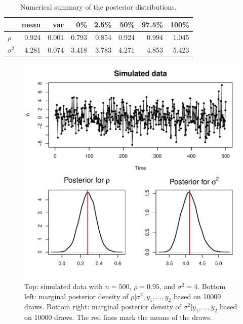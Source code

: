 \documentclass[12pt]{article}
\begin{document}
\begin{table}[H]
\begin{center}
\begin{tabular}{l|rrrrrrr}
           &  mean & var   & 0\%   & 2.5\% & 50\%  & 97.5\% & 100\% \\ \hline\hline
$\rho$     & 0.924 & 0.001 & 0.793 & 0.854 & 0.924 & 0.994  & 1.045 \\ 
$\sigma^2$ & 4.281 & 0.074 & 3.418 & 3.783 & 4.271 & 4.853  & 5.423 \\
\end{tabular}
\end{center}
\caption{Numerical summary of the posterior distributions.}
\end{table}

\newpage

\begin{figure}[H]
\begin{center}
\includegraphics[scale=1.00]{figs/fig_2.pdf}
\end{center}
\caption{Top: simulated data with $n=500$, $\rho=0.95$, and $\sigma^2=4$. Bottom left: marginal posterior density of $\rho|\sigma^2,y_1,\ldots,y_2$ based on 10000 draws. Bottom right: marginal posterior density of $\sigma^2|y_1,\ldots,y_2$ based on 10000 draws. The red lines mark the means of the draws.}
\end{figure}
\bigskip
\end{document}
